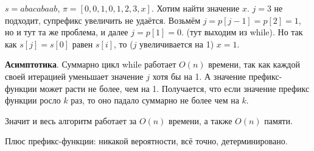 \Example $s = abacabaab$, $\pi = [0, 0, 1, 0, 1, 2, 3, x]$. Хотим найти значение $x$. $j = 3$ не подходит, супрефикс увеличить не удаётся. Возьмём $j = p[j - 1] = p[2] = 1$, но и тут та же проблема, и далее $j = p[1] = 0$. (тут выходим из while). Но так как $s[j] = s[0]$ равен $s[i]$, то ($j$ увеличивается на 1) $x = 1$.

\textbf{Асимптотика}. Суммарно цикл while работает $O(n)$ времени, так как каждой своей итерацией уменьшает значение $j$ хотя бы на 1. А значение префикс-функции может расти не более, чем на 1. Получается, что если значение префикс функции росло $k$ раз, то оно падало суммарно не более чем на $k$. 

Значит и весь алгоритм работает за $O(n)$ времени, а также $O(n)$ памяти.

Плюс префикс-функции: никакой вероятности, всё точно, детерминировано.
